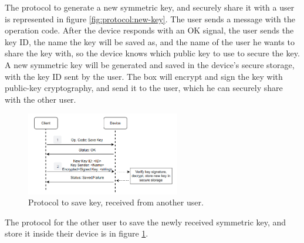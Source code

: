 The protocol to generate a new symmetric key, and securely share it with a user is represented in figure \ref{fig:protocol:new-key}.
The user sends a message with the operation code.
After the device responds with an OK signal, the user sends the key ID, the name the key will be saved as, and the name of the user he wants to share the key with, so the device knows which public key to use to secure the key.
A new symmetric key will be generated and saved in the device's secure storage, with the key ID sent by the user. The box will encrypt and sign the key with public-key cryptography, and send it to the user, which he can securely share with the other user.

\begin{figure}[h]
	\centering
	\includegraphics[width=0.6\textwidth]{./Images/save-key.png}
	\caption{Protocol to save key, received from another user.}
	\label{fig:protocol:save-key}
\end{figure}

The protocol for the other user to save the newly received symmetric key, and store it inside their device is in figure \ref{fig:protocol:save-key}.

